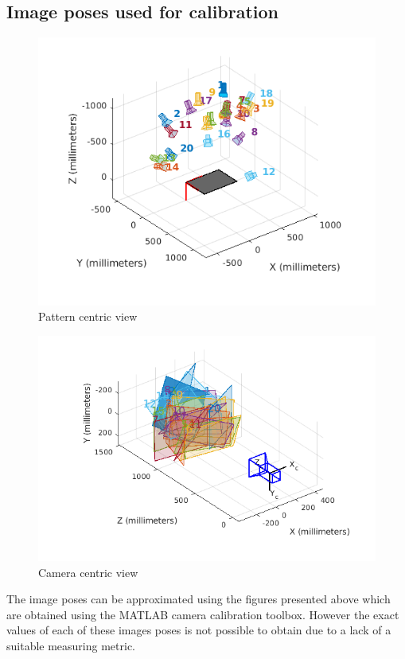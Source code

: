 \documentclass[11pt,a4paper]{article}
\begin{document}
	\subsection{Image poses used for calibration}
	
	\begin{figure}[H]
		\includegraphics[scale=0.7]{pattern_centric_view.png}
		\caption{Pattern centric view}
	\end{figure}
	
	\begin{figure}[H]
		\includegraphics[scale=0.7]{camera_centric_view.png}
		\caption{Camera centric view}
	\end{figure}
	The image poses can be approximated using the figures presented above which are obtained using the MATLAB camera calibration toolbox. However the exact values of each of these images poses is not possible to obtain due to a lack of a suitable measuring metric.
\end{document}
